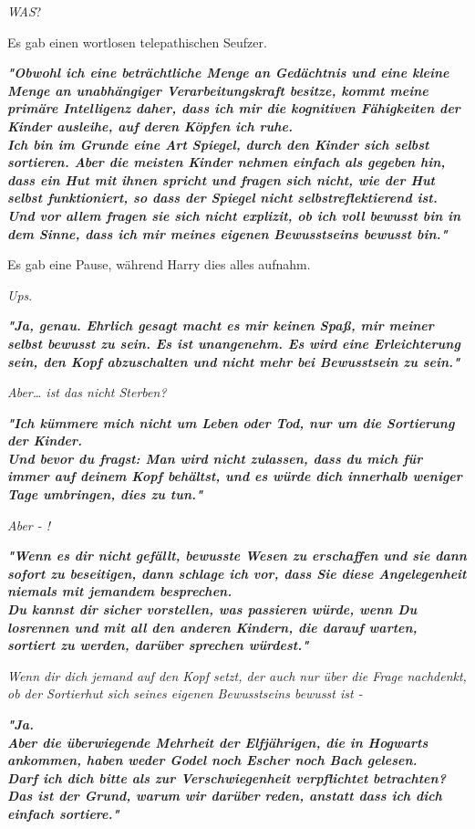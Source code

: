 {\emph{WAS}?

Es gab einen wortlosen telepathischen Seufzer.

\textbf{\emph{"Obwohl ich eine beträchtliche Menge an Gedächtnis und eine kleine Menge an unabhängiger Verarbeitungskraft besitze, kommt meine primäre Intelligenz daher, dass ich mir die kognitiven Fähigkeiten der Kinder ausleihe, auf deren Köpfen ich ruhe.\\ Ich bin im Grunde eine Art Spiegel, durch den Kinder sich selbst sortieren. Aber die meisten Kinder nehmen einfach als gegeben hin, dass ein Hut mit ihnen spricht und fragen sich nicht, wie der Hut selbst funktioniert, so dass der Spiegel nicht selbstreflektierend ist.}}\\ \textbf{\emph{\hfill\break Und vor allem fragen sie sich nicht explizit, ob ich voll bewusst bin in dem Sinne, dass ich mir meines eigenen Bewusstseins bewusst bin."}}

Es gab eine Pause, während Harry dies alles aufnahm.

\emph{Ups}.

\textbf{\emph{"Ja, genau. Ehrlich gesagt macht es mir keinen Spaß, mir meiner selbst bewusst zu sein. Es ist unangenehm. Es wird eine Erleichterung sein, den Kopf abzuschalten und nicht mehr bei Bewusstsein zu sein."}}

\emph{Aber… ist das nicht Sterben?}

\textbf{\emph{"Ich kümmere mich nicht um Leben oder Tod, nur um die Sortierung der Kinder.\\ Und bevor du fragst: Man wird nicht zulassen, dass du mich für immer auf deinem Kopf behältst, und es würde dich innerhalb weniger Tage umbringen, dies zu tun."}}

\emph{Aber - !}

\textbf{\emph{"Wenn es dir nicht gefällt, bewusste Wesen zu erschaffen und sie dann sofort zu beseitigen, dann schlage ich vor, dass Sie diese Angelegenheit niemals mit jemandem besprechen.\\ Du kannst dir sicher vorstellen, was passieren würde, wenn Du losrennen und mit all den anderen Kindern, die darauf warten, sortiert zu werden, darüber sprechen würdest."}}

\emph{Wenn dir dich jemand auf den Kopf setzt, der auch nur über die Frage nachdenkt, ob der Sortierhut sich seines eigenen Bewusstseins bewusst ist -}

\textbf{\emph{"Ja.\\ Aber die überwiegende Mehrheit der Elfjährigen, die in Hogwarts ankommen, haben weder Godel noch Escher noch Bach gelesen.\\ Darf ich dich bitte als zur Verschwiegenheit verpflichtet betrachten? Das ist der Grund, warum wir darüber reden, anstatt dass ich dich einfach sortiere."}}

}
